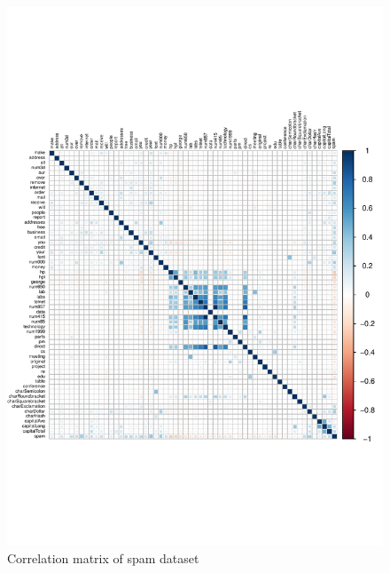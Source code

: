 \documentclass{article}\usepackage[]{graphicx}\usepackage[]{xcolor}
\makeatletter
\def\maxwidth{ %
  \ifdim\Gin@nat@width>\linewidth
    \linewidth
  \else
    \Gin@nat@width
  \fi
}
\newenvironment{knitrout}{}{} %
\makeatother
\begin{document}
\begin{knitrout}
\color{fgcolor}\begin{figure}[h]
\includegraphics[width=\maxwidth]{figure/corrMatrix-1} \caption[\label{fig8} Correlation matrix of spam dataset]{\label{fig8} Correlation matrix of spam dataset}\label{fig:corrMatrix}
\end{figure}

\end{knitrout}
\end{document}
